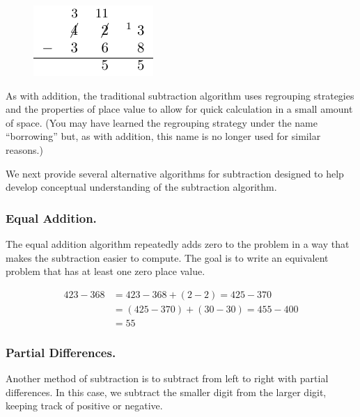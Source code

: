 \documentclass[
]{book}
\theoremstyle{definition}
\theoremstyle{definition}
\theoremstyle{definition}
\theoremstyle{remark}
\begin{document}
\begin{figure}

{\centering \includegraphics[width=0.3\linewidth]{tikz/subtraction-model-algorithm} 

}

\end{figure}

As with addition, the traditional subtraction algorithm uses regrouping strategies and the properties of place value to allow for quick calculation in a small amount of space. (You may have learned the regrouping strategy under the name ``borrowing'' but, as with addition, this name is no longer used for similar reasons.)

We next provide several alternative algorithms for subtraction designed to help develop conceptual understanding of the subtraction algorithm.

\hypertarget{equal-addition.}{%
\subsubsection*{Equal Addition.}\label{equal-addition.}}

The equal addition algorithm repeatedly adds zero to the problem in a way that makes the subtraction easier to compute. The goal is to write an equivalent problem that has at least one zero place value.

\begin{align*}
423-368 &= 423-368 + (2-2) = 425-370 \\
  &= (425-370) + (30-30) = 455-400 \\
  &= 55
\end{align*}

\hypertarget{partial-differences.}{%
\subsubsection*{Partial Differences.}\label{partial-differences.}}

Another method of subtraction is to subtract from left to right with partial differences. In this case, we subtract the smaller digit from the larger digit, keeping track of positive or negative.
\end{document}
